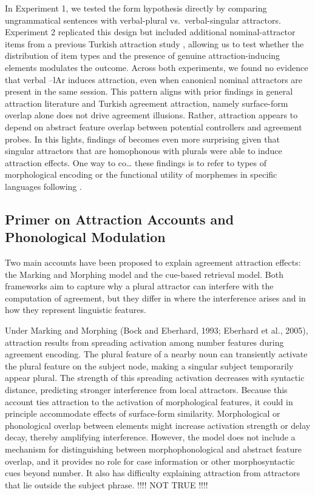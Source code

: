 \documentclass[
  authoryear,
  3p]{elsarticle}
\begin{document}
In Experiment 1, we tested the form hypothesis directly by comparing
ungrammatical sentences with verbal-plural vs.~verbal-singular
attractors. Experiment 2 replicated this design but included additional
nominal-attractor items from a previous Turkish attraction study
\citep{TurkLogacev2024}, allowing us to test whether the distribution of
item types and the presence of genuine attraction-inducing elements
modulates the outcome. Across both experiments, we found no evidence
that verbal --lAr induces attraction, even when canonical nominal
attractors are present in the same session. This pattern aligns with
prior findings in general attraction literature and Turkish agreement
attraction, namely surface-form overlap alone does not drive agreement
illusions. Rather, attraction appears to depend on abstract feature
overlap between potential controllers and agreement probes. In this
lights, findings of \citet{Slioussar2018} becomes even more surprising
given that singular attractors that are homophonous with plurals were
able to induce attraction effects. One way to co\ldots{} these findings
is to refer to types of morphological encoding or the functional utility
of morphemes in specific languages following \citet{KeshevDillon2024}.

\subsection{Primer on Attraction Accounts and Phonological
Modulation}\label{primer-on-attraction-accounts-and-phonological-modulation}

Two main accounts have been proposed to explain agreement attraction
effects: the Marking and Morphing model and the cue-based retrieval
model. Both frameworks aim to capture why a plural attractor can
interfere with the computation of agreement, but they differ in where
the interference arises and in how they represent linguistic features.

Under Marking and Morphing (Bock and Eberhard, 1993; Eberhard et al.,
2005), attraction results from spreading activation among number
features during agreement encoding. The plural feature of a nearby noun
can transiently activate the plural feature on the subject node, making
a singular subject temporarily appear plural. The strength of this
spreading activation decreases with syntactic distance, predicting
stronger interference from local attractors. Because this account ties
attraction to the activation of morphological features, it could in
principle accommodate effects of surface-form similarity. Morphological
or phonological overlap between elements might increase activation
strength or delay decay, thereby amplifying interference. However, the
model does not include a mechanism for distinguishing between
morphophonological and abstract feature overlap, and it provides no role
for case information or other morphosyntactic cues beyond number. It
also has difficulty explaining attraction from attractors that lie
outside the subject phrase. !!!! NOT TRUE !!!!
\end{document}
